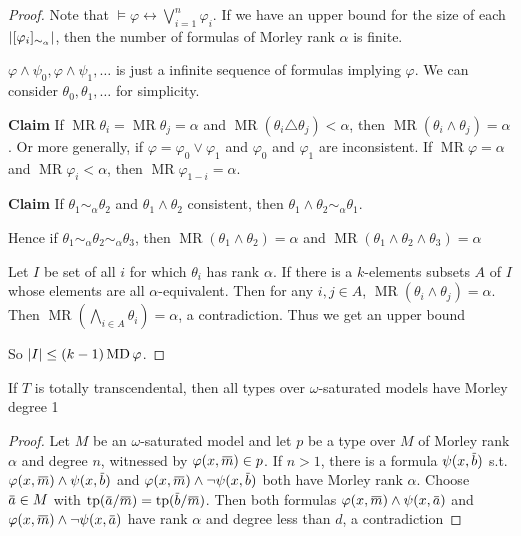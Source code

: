 \documentclass[11pt]{article}
\DeclareMathOperator{\MR}{MR}
\DeclareMathOperator{\MD}{MD}
\begin{document}
\begin{proof}
Note that \(\vDash\varphi\leftrightarrow\bigvee_{i=1}^{n}\varphi_i\). If we have an upper bound for the size of
each \(\abs{[\varphi_i]_{\sim_\alpha}}\), then the number of formulas of Morley rank \(\alpha\) is finite.

\(\varphi\wedge\psi_0,\varphi\wedge\psi_1,\dots\) is just a infinite sequence of formulas implying \(\varphi\). We can
consider \(\theta_0,\theta_1,\dots\) for simplicity.

\textbf{Claim} If \(\MR\theta_i=\MR\theta_j=\alpha\) and \(\MR(\theta_i\triangle\theta_j)<\alpha\), then \(\MR(\theta_i\wedge\theta_j)=\alpha\). Or more generally,
if \(\varphi=\varphi_0\vee\varphi_1\) and \(\varphi_0\) and \(\varphi_1\) are inconsistent. If \(\MR\varphi=\alpha\) and \(\MR\varphi_i<\alpha\),
then \(\MR\varphi_{1-i}=\alpha\).

\textbf{Claim} If \(\theta_1\sim_\alpha\theta_2\) and \(\theta_1\wedge\theta_2\) consistent, then \(\theta_1\wedge\theta_2\sim_\alpha\theta_1\).

Hence if \(\theta_1\sim_\alpha\theta_2\sim_\alpha\theta_3\), then \(\MR(\theta_1\wedge\theta_2)=\alpha\) and \(\MR(\theta_1\wedge\theta_2\wedge\theta_3)=\alpha\)

Let \(I\) be set of all \(i\) for which \(\theta_i\) has rank \(\alpha\). If there is a \(k\)-elements
subsets \(A\) of \(I\) whose elements are all \(\alpha\)-equivalent. Then for
any \(i,j\in A\), \(\MR(\theta_i\wedge\theta_j)=\alpha\). Then \(\MR(\bigwedge_{i\in A}\theta_i)=\alpha\), a contradiction. Thus we get an
upper bound

So \(\abs{I}\le(k-1)\MD\varphi\).
\end{proof}

\begin{exercise}
\label{ex6.2.4}
If \(T\) is totally transcendental, then all types over \(\omega\)-saturated models have Morley degree 1
\end{exercise}

\begin{proof}
Let \(M\) be an \(\omega\)-saturated model and let \(p\) be a type over \(M\) of Morley rank \(\alpha\) and
degree \(n\), witnessed by \(\varphi(x,\barm)\in p\). If \(n>1\), there is a formula \(\psi(x,\barb)\) s.t.
\(\varphi(x,\barm)\wedge\psi(x,\barb)\) and \(\varphi(x,\barm)\wedge\neg\psi(x,\barb)\) both have Morley rank \(\alpha\).
Choose \(\bara\in M\) with \(\tp(\bara/\barm)=\tp(\barb/\barm)\). Then both formulas
\(\varphi(x,\barm)\wedge\psi(x,\bara)\) and \(\varphi(x,\barm)\wedge\neg\psi(x,\bara)\) have rank \(\alpha\) and degree less than \(d\),
a contradiction
\end{proof}
\end{document}
